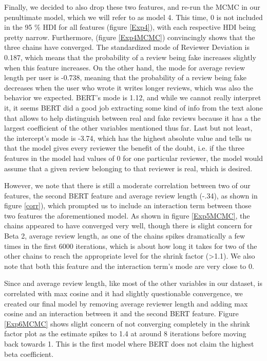 \documentclass[man, floatsintext, 10pt]{apa6}
\begin{document}
Finally, we decided to also drop these two features, and re-run the MCMC in our penultimate model, which we will refer to as model 4. This time,  0 is not included in the 95 \% HDI for all features (figure \ref{Exp4}), with each respective HDI being pretty narrow. Furthermore, (figure \ref{Exp4MCMC}) convincingly shows that the three chains have converged.  The standardized  mode of Reviewer Deviation is 0.187, which means that the probability of a review being fake increases slightly when this feature increases. On the other hand, the mode for average review length per user is -0.738, meaning that the probability of a review being fake decreases when the user who wrote it writes longer reviews, which was also the behavior we expected. BERT's mode is 1.12, and while we cannot really interpret it, it seems BERT did a good job extracting some kind of info from the text alone that allows to help distinguish between real and fake reviews because it has a the largest coefficient of the other variables mentioned thus far. Last but not least, the intercept's mode is -3.74, which has the highest absolute value and tells us that the model gives every reviewer the benefit of the doubt, i.e. if the three features in the model had values of 0 for one particular reviewer, the model would assume that a given review belonging to that reviewer is real, which is desired.	

However, we note that there is still a moderate correlation between two of our features, the second BERT feature and average review length (-.34), as shown in figure \ref{corr}), which prompted us to include an interaction term between those two features the aforementioned model. As shown in figure \ref{Exp5MCMC}, the chains appeared to have converged very well, though there is slight concern for Beta 2, average review length, as one of the chains spikes dramatically a few times in the first 6000 iterations, which is about how long it takes for two of the other chains to reach the appropriate level for the shrink factor (>1.1). We also note that both this feature and the interaction term's mode are very close to 0.	

Since and average review length, like most of the other variables in our dataset, is correlated with max cosine and it had slightly questionable convergence, we created our final model by removing average reviewer length and adding max cosine and an interaction between it and the second BERT feature. Figure \ref{Exp6MCMC} shows slight concern of not converging completely in the shrink factor plot as the estimate spikes to 1.4 at around 8 iterations before moving back towards 1. This is the first model where BERT does not claim the highest beta coefficient.
\vspace{2mm}
\end{document}
